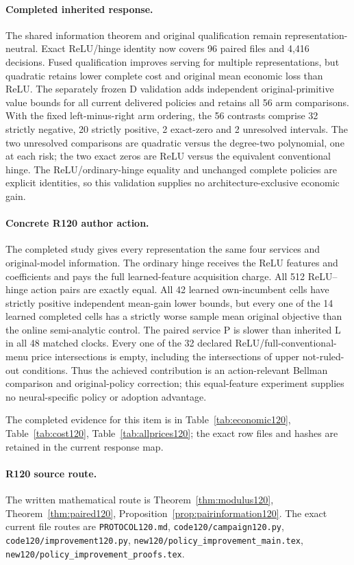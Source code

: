 \paragraph{Completed inherited response.}
The shared information theorem and original qualification remain representation-neutral. Exact ReLU/hinge identity now covers 96 paired files and 4,416 decisions. Fused qualification improves serving for multiple representations, but quadratic retains lower complete cost and original mean economic loss than ReLU. The separately frozen D validation adds independent original-primitive value bounds for all current delivered policies and retains all 56 arm comparisons. With the fixed left-minus-right arm ordering, the 56 contrasts comprise 32 strictly negative, 20 strictly positive, 2 exact-zero and 2 unresolved intervals. The two unresolved comparisons are quadratic versus the degree-two polynomial, one at each risk; the two exact zeros are ReLU versus the equivalent conventional hinge. The ReLU/ordinary-hinge equality and unchanged complete policies are explicit identities, so this validation supplies no architecture-exclusive economic gain.
\paragraph{Concrete R120 author action.}
The completed study gives every representation the same four services and original-model information. The ordinary hinge receives the ReLU features and coefficients and pays the full learned-feature acquisition charge. All 512 ReLU--hinge action pairs are exactly equal. All 42 learned own-incumbent cells have strictly positive independent mean-gain lower bounds, but every one of the 14 learned completed cells has a strictly worse sample mean original objective than the online semi-analytic control. The paired service P is slower than inherited L in all 48 matched clocks. Every one of the 32 declared ReLU/full-conventional-menu price intersections is empty, including the intersections of upper not-ruled-out conditions. Thus the achieved contribution is an action-relevant Bellman comparison and original-policy correction; this equal-feature experiment supplies no neural-specific policy or adoption advantage.

The completed evidence for this item is in Table~\ref{tab:economic120}, Table~\ref{tab:cost120}, Table~\ref{tab:allprices120}; the exact row files and hashes are retained in the current response map.
\paragraph{R120 source route.}
The written mathematical route is Theorem~\ref{thm:modulus120}, Theorem~\ref{thm:paired120}, Proposition~\ref{prop:pairinformation120}. The exact current file routes are \nolinkurl{PROTOCOL120.md}, \nolinkurl{code120/campaign120.py}, \nolinkurl{code120/improvement120.py}, \nolinkurl{new120/policy_improvement_main.tex}, \nolinkurl{new120/policy_improvement_proofs.tex}.

